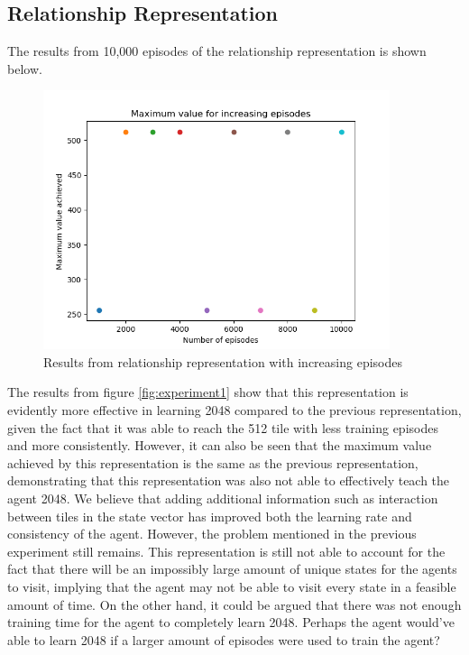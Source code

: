 \subsection{Relationship Representation}
The results from 10,000 episodes of the relationship representation is shown below.

\begin{figure}[h]
	\centering
	\includegraphics[width=4.0in]{experiment2}
	\caption{Results from relationship representation with increasing episodes}
	\label{fig:experiment2}
\end{figure}

The results from figure \ref{fig:experiment1} show that this representation is evidently more effective in learning 2048 compared to the previous representation, given the fact that it was able to reach the 512 tile with less training episodes and more consistently. However, it can also be seen that the maximum value achieved by this representation is the same as the previous representation, demonstrating that this representation was also not able to effectively teach the agent 2048. We believe that adding additional information such as interaction between tiles in the state vector has improved both the learning rate and consistency of the agent. However, the problem mentioned in the previous experiment still remains. This representation is still not able to account for the fact that there will be an impossibly large amount of unique states for the agents to visit, implying that the agent may not be able to visit every state in a feasible amount of time. 
On the other hand, it could be argued that there was not enough training time for the agent to completely learn 2048. Perhaps the agent would've able to learn 2048 if a larger amount of episodes were used to train the agent?
